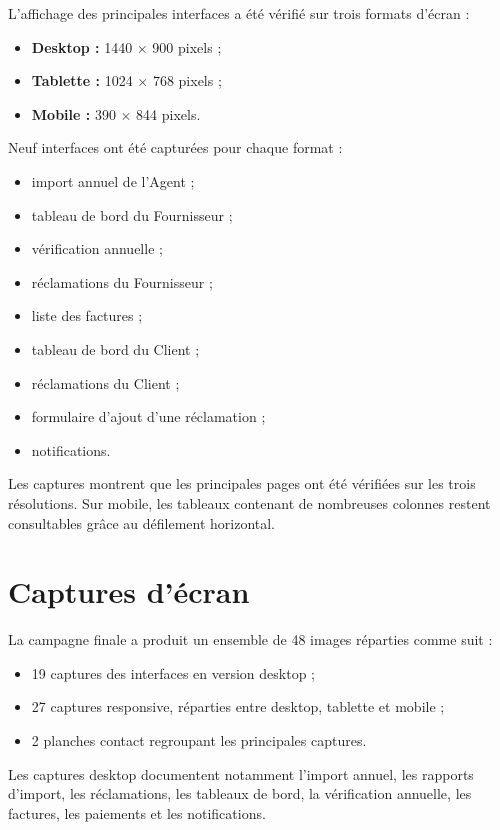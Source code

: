 L'affichage des principales interfaces a été vérifié sur trois formats d'écran :
\begin{itemize}
    \item \textbf{Desktop :} 1440 $\times$ 900 pixels ;
    \item \textbf{Tablette :} 1024 $\times$ 768 pixels ;
    \item \textbf{Mobile :} 390 $\times$ 844 pixels.
\end{itemize}

Neuf interfaces ont été capturées pour chaque format :
\begin{itemize}
    \item import annuel de l'Agent ;
    \item tableau de bord du Fournisseur ;
    \item vérification annuelle ;
    \item réclamations du Fournisseur ;
    \item liste des factures ;
    \item tableau de bord du Client ;
    \item réclamations du Client ;
    \item formulaire d'ajout d'une réclamation ;
    \item notifications.
\end{itemize}

Les captures montrent que les principales pages ont été vérifiées sur les trois résolutions. Sur mobile, les tableaux contenant de nombreuses colonnes restent consultables grâce au défilement horizontal.

\section{Captures d'écran}

La campagne finale a produit un ensemble de 48 images réparties comme suit :
\begin{itemize}
    \item 19 captures des interfaces en version desktop ;
    \item 27 captures responsive, réparties entre desktop, tablette et mobile ;
    \item 2 planches contact regroupant les principales captures.
\end{itemize}

Les captures desktop documentent notamment l'import annuel, les rapports d'import, les réclamations, les tableaux de bord, la vérification annuelle, les factures, les paiements et les notifications.

